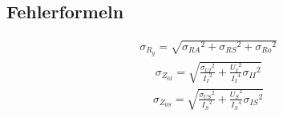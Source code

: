 \documentclass[a4paper,10pt]{scrbook}
\begin{document}
\subsection*{Fehlerformeln}

\begin{align*}\sigma_{R_g}=\sqrt{{\sigma_{{R A}}}^{2} + {\sigma_{{R S}}}^{2} + {\sigma_{{R o}}}^{2}}\end{align*}\begin{align*}\sigma_{Z_{0I}}=\sqrt{\frac{{\sigma_{{U I}}}^{2}}{{I_{I}}^{2}} + \frac{{U_{I}}^{2}}{{I_{I}}^{4}} {\sigma_{{I I}}}^{2}}\end{align*}\begin{align*}\sigma_{Z_{0S}}=\sqrt{\frac{{\sigma_{{U S}}}^{2}}{{I_{S}}^{2}} + \frac{{U_{S}}^{2}}{{I_{S}}^{4}} {\sigma_{{I S}}}^{2}}\end{align*}
\end{document}
